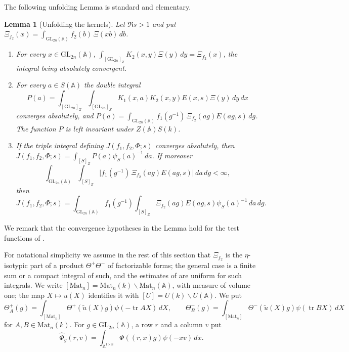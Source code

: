 \documentclass[11pt,oneside,notitlepage]{book}
\numberwithin{equation}{section}
\theoremstyle{plain}
\newtheorem{lemma}[theorem]{Lemma}
\theoremstyle{definition}
\newcommand{\A}{\mathbb{A}}
\newcommand{\GL}{\mathrm{GL}}
\newcommand{\Mat}{\mathrm{Mat}}
\newcommand{\tr}{\operatorname{tr}}
\begin{document}
The following unfolding Lemma is standard and elementary.
\begin{lemma}[Unfolding the kernels]\label{lem:kernels}
	Let $\Re s>1$ and put $\Xi_{f_2}(x)=\int_{\GL_{2n}(\A)}f_2(b)\,\Xi(xb)\,db$.
	\begin{enumerate}[label=(\alph*)]
		\item For every $x\in\GL_{2n}(\A)$, $\int_{[\GL_{2n}]_Z}K_2(x,y)\Xi(y)\,dy=\Xi_{f_2}(x)$, the integral being absolutely convergent.
		\item For every $a\in S(\A)$ the double integral
		\[P(a)=\int_{[\GL_{2n}]_Z}\int_{[\GL_{2n}]_Z}K_1(x,a)K_2(x,y)E(x,s)\Xi(y)\,dy\,dx\]
		converges absolutely, and $P(a)=\int_{\GL_{2n}(\A)}f_1(g^{-1})\,\Xi_{f_2}(ag)E(ag,s)\,dg$. The function $P$ is left invariant under $Z(\A)S(k)$.
		\item If the triple integral defining $J(f_1,f_2,\Phi;s)$ converges absolutely, then $J(f_1,f_2,\Phi;s)=\int_{[S]_Z}P(a)\psi_S(a)^{-1}\,da$. If moreover
		\[\int_{\GL_{2n}(\A)}\int_{[S]_Z}\bigl|f_1(g^{-1})\,\Xi_{f_2}(ag)E(ag,s)\bigr|\,da\,dg<\infty,\]
		then
		\[J(f_1,f_2,\Phi;s)=\int_{\GL_{2n}(\A)}f_1(g^{-1})\int_{[S]_Z}\Xi_{f_2}(ag)E(ag,s)\psi_S(a)^{-1}\,da\,dg.\]
	\end{enumerate}
\end{lemma}

We remark that the convergence hypotheses in the Lemma hold for the test functions of .

For notational simplicity we assume in the rest of this section that $\Xi_{f_2}$ is the $\eta$-isotypic part of a product $\Theta^+\Theta^-$ of factorizable forms; the general case is a finite sum or a compact integral of such, and the estimates of  are uniform for such integrals. We write $[\Mat_n]=\Mat_n(k)\backslash\Mat_n(\A)$, with measure of volume one; the map $X\mapsto u(X)$ identifies it with $[U]=U(k)\backslash U(\A)$. We put
\[\Theta^{+}_A(g)=\int_{[\Mat_n]}\Theta^+(\tilde u(X)g)\psi(-\tr AX)\,dX,\qquad \Theta^{-}_B(g)=\int_{[\Mat_n]}\Theta^-(\tilde u(X)g)\psi(\tr BX)\,dX\]
for $A,B\in\Mat_n(k)$. For $g\in\GL_{2n}(\A)$, a row $r$ and a column $v$ put
\begin{equation}\label{eq:partialFT}
	\widehat\Phi_g(r,v)=\int_{\A^{1\times n}}\Phi((r,x)g)\psi(-xv)\,dx.
\end{equation}
\end{document}
